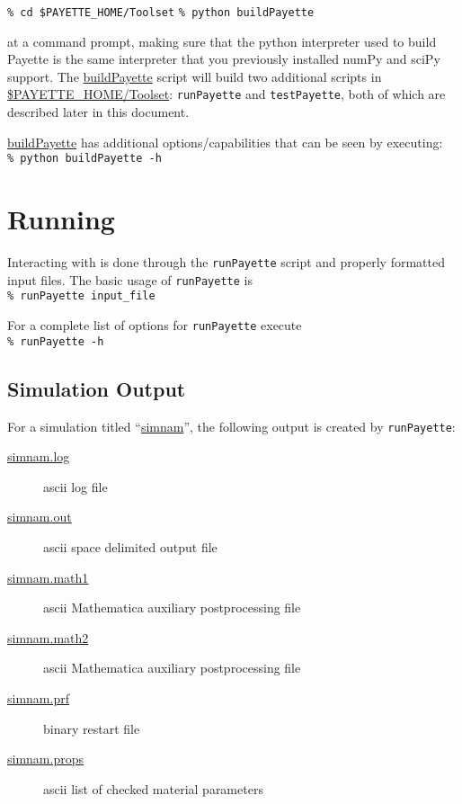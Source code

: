\documentclass[11pt]{article}
\newcommand{\payette}{{\sc{Payette}}}
\newcommand{\runPayette}{{\texttt{runPayette}}}
\newcommand{\testPayette}{{\texttt{testPayette}}}
\newcommand{\termcommand}[1]{\indent\hspace{.2in}\texttt{\% #1}\newline}
\begin{document}
\termcommand{cd \$PAYETTE\_HOME/Toolset}
\termcommand{python buildPayette}

\noindent at a command prompt, making sure that the python interpreter used to
build Payette is the same interpreter that you previously installed numPy and
sciPy support. The \url{buildPayette} script will build two additional scripts in
\url{$PAYETTE_HOME/Toolset}: \runPayette{} and \testPayette{}, both of
which are described later in this document.

\url{buildPayette} has additional options/capabilities that can be seen by
executing: \\

\termcommand{python buildPayette -h}

\section{Running \payette{}}
Interacting with \payette{} is done through the \runPayette{} script and
properly formatted input files.  The basic usage of \runPayette{} is \\

\termcommand{runPayette input\_file}

For a complete list of options for \runPayette{} execute \\

\termcommand{runPayette -h}

\subsection{Simulation Output}
For a simulation titled ``\url{simnam}'', the following output is created by
\runPayette{}:
\begin{description}
  \item[\url{simnam.log}] ascii log file
  \item[\url{simnam.out}] ascii space delimited output file
  \item[\url{simnam.math1}] ascii Mathematica auxiliary postprocessing file
  \item[\url{simnam.math2}] ascii Mathematica auxiliary postprocessing file
  \item[\url{simnam.prf}] binary restart file
  \item[\url{simnam.props}] ascii list of checked material parameters
\end{description}
\end{document}
